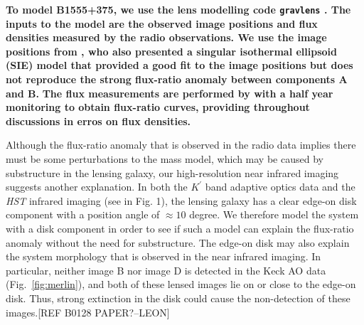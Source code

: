 \documentclass[useAMS,usenatbib]{mn2e}
\begin{document}
\textbf{To model B1555+375, we use the lens modelling code {\tt gravlens} \citep{Kee01}.  
The inputs to the model are the observed image
positions and flux densities measured by the radio observations.
We use the image positions from \citet{Marlow99}, who also presented a singular isothermal ellipsoid
(SIE) model that provided a good fit to the image positions but
does not reproduce the strong flux-ratio anomaly between components A
and B.}  %
\textbf{The flux measurements are performed by \citet{K03} with a half year monitoring to obtain flux-ratio curves, providing throughout discussions in erros on flux densities.}

Although the flux-ratio anomaly that is observed in the radio data implies there must be some perturbations to the mass model, which may be
caused by substructure in the lensing galaxy, our high-resolution near
infrared imaging suggests another explanation.  In both the $K^\prime$
band adaptive optics data and the \textit{HST} infrared imaging (see in
Fig. 1), the lensing galaxy has a clear edge-on disk component with a
position angle of $\approx 10$ degree.  We therefore model the system
with a disk component in order to see if such a model can explain the
flux-ratio anomaly without the need for substructure.  The edge-on
disk may also explain the system morphology that is observed in the
near infrared imaging.  In particular, neither image B nor image D is
detected in the Keck AO data (Fig.~\ref{fig:merlin}), and both of
these lensed images lie on or close to the edge-on disk.  Thus, strong
extinction in the disk could cause the non-detection of these
images.[REF B0128 PAPER?--LEON]
\end{document}
